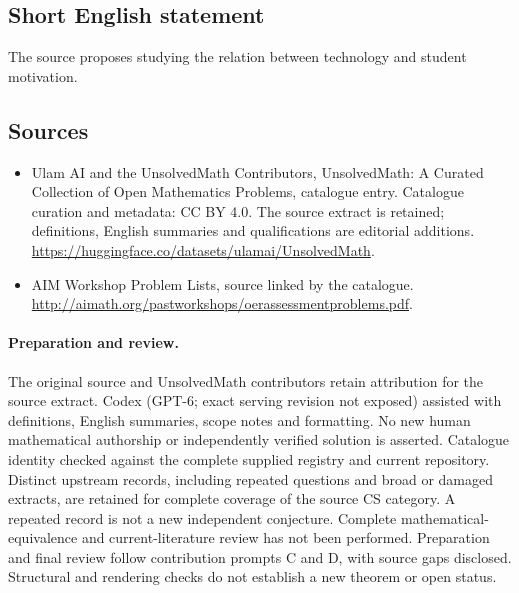 \documentclass[11pt]{article}
\begin{document}
\subsection{Short English statement}
The source proposes studying the relation between technology and student motivation.
\subsection{Sources}
\begin{itemize}
\item[\hypertarget{source:statement:1}{S1}] Ulam AI and the UnsolvedMath Contributors, UnsolvedMath: A Curated Collection of Open Mathematics Problems, catalogue entry. Catalogue curation and metadata: CC BY 4.0. The source extract is retained; definitions, English summaries and qualifications are editorial additions.
\url{https://huggingface.co/datasets/ulamai/UnsolvedMath}.
\item[\hypertarget{source:statement:2}{S2}] AIM Workshop Problem Lists, source linked by the catalogue.
\url{http://aimath.org/pastworkshops/oerassessmentproblems.pdf}.
\end{itemize}
\paragraph{Preparation and review.}
The original source and UnsolvedMath contributors retain attribution for the source extract. Codex (GPT-6; exact serving revision not exposed) assisted with definitions, English summaries, scope notes and formatting. No new human mathematical authorship or independently verified solution is asserted. Catalogue identity checked against the complete supplied registry and current repository. Distinct upstream records, including repeated questions and broad or damaged extracts, are retained for complete coverage of the source CS category. A repeated record is not a new independent conjecture. Complete mathematical-equivalence and current-literature review has not been performed. Preparation and final review follow contribution prompts C and D, with source gaps disclosed. Structural and rendering checks do not establish a new theorem or open status.
\label{end:statement}
\end{document}
